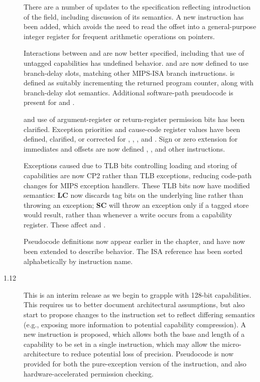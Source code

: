 \begin{description}
  There are a number of updates to the specification reflecting introduction
  of the \coffset{} field, including discussion of its semantics.
  A new  instruction has been added, which avoids the
  need to read the offset into a general-purpose integer register for frequent
  arithmetic operations on pointers.

  Interactions between \EPC{} and \EPCC{} are now better specified, including
    that use of untagged capabilities has undefined behavior.
   and  are now defined to use
    branch-delay slots, matching other MIPS-ISA branch instructions.
   is defined as suitably incrementing the returned
    program counter, along with branch-delay slot semantics.
  Additional software-path pseudocode is present for  and
    .

   and  use of argument-register
    or return-register permission bits has been clarified.
  Exception priorities and cause-code register values have been defined,
    clarified, or corrected for ,
  , , and .
  Sign or zero extension for immediates and offsets are now defined
    , ,
    and other instructions.

  Exceptions caused due to TLB bits controlling loading and storing of
    capabilities are now CP2 rather than TLB exceptions, reducing code-path
    changes for MIPS exception handlers.
  These TLB bits now have modified semantics: {\bf LC} now discards tag bits
    on the underlying line rather than throwing an exception; {\bf SC} will
    throw an exception only if a tagged store would result, rather than
    whenever a write occurs from a capability register.
  These affect  and .

  Pseudocode definitions now appear earlier in the chapter, and have now been
    extended to describe \EPCC{} behavior.
  The ISA reference has been sorted alphabetically by instruction name.

\item[1.12] This is an interim release as we begin to grapple with 128-bit
  capabilities.
  This requires us to better document architectural assumptions, but also
  start to propose changes to the instruction set to reflect differing
  semantics (e.g., exposing more information to potential capability
  compression).
  A new  instruction is proposed, which allows both
  the base and length of a capability to be set in a single instruction, which
  may allow the micro-architecture to reduce potential loss of precision.
  Pseudocode is now provided for both the pure-exception version of the
   instruction, and also hardware-accelerated permission
  checking.


\end{description}
